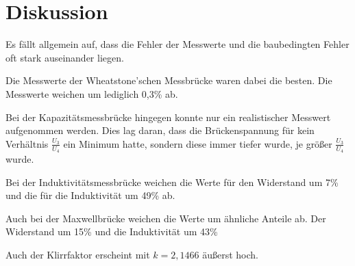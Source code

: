 \section{Diskussion}
\label{sec:Diskussion}
Es fällt allgemein auf, dass die Fehler der Messwerte und die baubedingten Fehler oft stark auseinander liegen.

Die Messwerte der Wheatstone'schen Messbrücke waren dabei die besten. Die Messwerte weichen um lediglich 0,3\% ab.

Bei der Kapazitätsmessbrücke hingegen konnte nur ein realistischer Messwert aufgenommen werden. Dies lag daran, dass die Brückenspannung für kein Verhältnis $\frac{U_3}{U_4}$
ein Minimum hatte, sondern diese immer tiefer wurde, je größer $\frac{U_3}{U_4}$ wurde.

Bei der Induktivitätsmessbrücke weichen die Werte für den Widerstand um 7\% und die für die Induktivität um 49\% ab.

Auch bei der Maxwellbrücke weichen die Werte um ähnliche Anteile ab. Der Widerstand um 15\% und die Induktivität um 43\%

Auch der Klirrfaktor erscheint mit $k = 2,1466$ äußerst hoch.